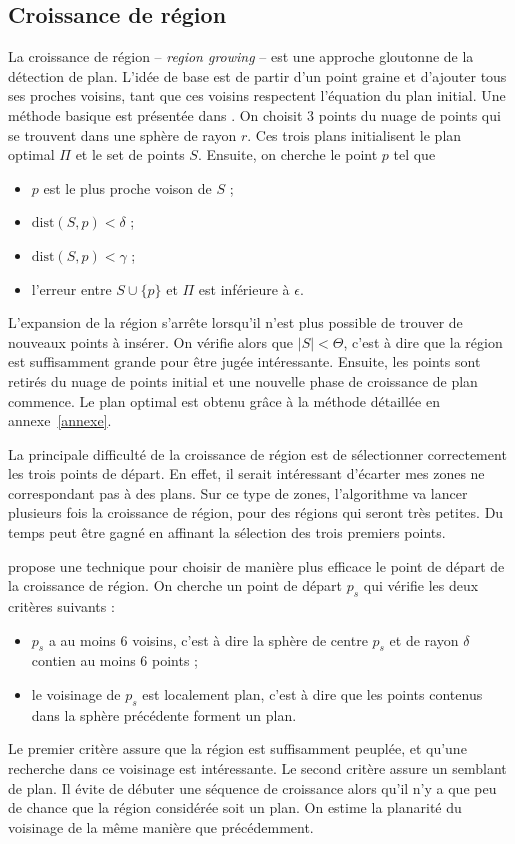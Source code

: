 ﻿\documentclass[12pt, twoside]{article}
\begin{document}
\subsection{Croissance de région}
La croissance de région -- \textit{region growing} -- est une approche gloutonne de la détection de plan. L’idée de base est de partir d’un point graine et d’ajouter tous ses proches voisins, tant que ces voisins respectent l’équation du plan initial. Une méthode basique est présentée dans \cite{reggrow1}. On choisit 3 points du nuage de points qui se trouvent dans une sphère de rayon $r$. Ces trois plans initialisent le plan optimal $\Pi$ et le set de points $S$. Ensuite, on cherche le point $p$ tel que
\begin{itemize}
  \item $p$ est le plus proche voison de $S$ ;
  \item $\text{dist}(S,p) < \delta$ ;
  \item $\text{dist}(S,p) < \gamma$ ;
  \item l'erreur entre $S\cup\{p\}$ et $\Pi$ est inférieure à $\epsilon$.
\end{itemize}

L'expansion de la région s'arrête lorsqu'il n'est plus possible de trouver de nouveaux points à insérer. On vérifie alors que $\vert S\vert < \Theta$, c'est à dire que la région est suffisamment grande pour être jugée intéressante. Ensuite, les points sont retirés du nuage de points initial et une nouvelle phase de croissance de plan commence. Le plan optimal est obtenu grâce à la méthode détaillée en annexe~\ref{annexe}.

La principale difficulté de la croissance de région est de sélectionner correctement les trois points de départ. En effet, il serait intéressant d'écarter mes zones ne correspondant pas à des plans. Sur ce type de zones, l'algorithme va lancer plusieurs fois la croissance de région, pour des régions qui seront très petites. Du temps peut être gagné en affinant la sélection des trois premiers points.

\cite{reggrow2} propose une technique pour choisir de manière plus efficace le point de départ de la croissance de région. On cherche un point de départ $p_s$ qui vérifie les deux critères suivants :
\begin{itemize}
  \item $p_s$ a au moins 6 voisins, c'est à dire la sphère de centre $p_s$ et de rayon $\delta$ contien au moins 6 points ;
  \item le voisinage de $p_s$ est localement plan, c'est à dire que les points contenus dans la sphère précédente forment un plan.
\end{itemize}
Le premier critère assure que la région est suffisamment peuplée, et qu’une recherche dans ce voisinage est intéressante. Le second critère assure un semblant de plan. Il évite de débuter une séquence de croissance alors qu’il n’y a que peu de chance que la région considérée soit un plan. On estime la planarité du voisinage de la même manière que précédemment.
\end{document}
